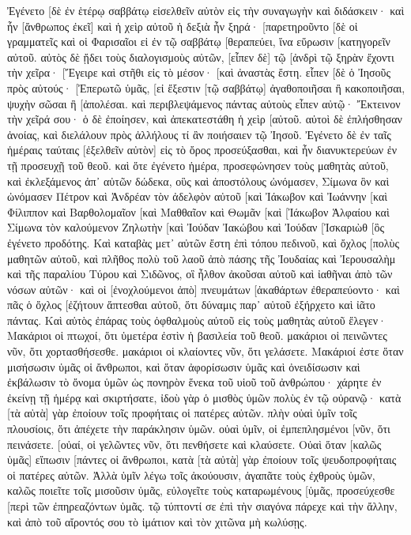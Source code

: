 Ἐγένετο [δὲ ἐν ἑτέρῳ σαββάτῳ εἰσελθεῖν αὐτὸν εἰς τὴν συναγωγὴν καὶ διδάσκειν· καὶ ἦν [ἄνθρωπος ἐκεῖ] καὶ ἡ χεὶρ αὐτοῦ ἡ δεξιὰ ἦν ξηρά· 
[παρετηροῦντο [δὲ οἱ γραμματεῖς καὶ οἱ Φαρισαῖοι εἰ ἐν τῷ σαββάτῳ [θεραπεύει, ἵνα εὕρωσιν [κατηγορεῖν αὐτοῦ. 
αὐτὸς δὲ ᾔδει τοὺς διαλογισμοὺς αὐτῶν, [εἶπεν δὲ] τῷ [ἀνδρὶ τῷ ξηρὰν ἔχοντι τὴν χεῖρα· [Ἔγειρε καὶ στῆθι εἰς τὸ μέσον· [καὶ ἀναστὰς ἔστη. 
εἶπεν [δὲ ὁ Ἰησοῦς πρὸς αὐτούς· [Ἐπερωτῶ ὑμᾶς, [εἰ ἔξεστιν [τῷ σαββάτῳ] ἀγαθοποιῆσαι ἢ κακοποιῆσαι, ψυχὴν σῶσαι ἢ [ἀπολέσαι. 
καὶ περιβλεψάμενος πάντας αὐτοὺς εἶπεν αὐτῷ· Ἔκτεινον τὴν χεῖρά σου· ὁ δὲ ἐποίησεν, καὶ ἀπεκατεστάθη ἡ χεὶρ [αὐτοῦ. 
αὐτοὶ δὲ ἐπλήσθησαν ἀνοίας, καὶ διελάλουν πρὸς ἀλλήλους τί ἂν ποιήσαιεν τῷ Ἰησοῦ. 
Ἐγένετο δὲ ἐν ταῖς ἡμέραις ταύταις [ἐξελθεῖν αὐτὸν] εἰς τὸ ὄρος προσεύξασθαι, καὶ ἦν διανυκτερεύων ἐν τῇ προσευχῇ τοῦ θεοῦ. 
καὶ ὅτε ἐγένετο ἡμέρα, προσεφώνησεν τοὺς μαθητὰς αὐτοῦ, καὶ ἐκλεξάμενος ἀπ᾽ αὐτῶν δώδεκα, οὓς καὶ ἀποστόλους ὠνόμασεν, 
Σίμωνα ὃν καὶ ὠνόμασεν Πέτρον καὶ Ἀνδρέαν τὸν ἀδελφὸν αὐτοῦ [καὶ Ἰάκωβον καὶ Ἰωάννην [καὶ Φίλιππον καὶ Βαρθολομαῖον 
[καὶ Μαθθαῖον καὶ Θωμᾶν [καὶ [Ἰάκωβον Ἁλφαίου καὶ Σίμωνα τὸν καλούμενον Ζηλωτὴν 
[καὶ Ἰούδαν Ἰακώβου καὶ Ἰούδαν [Ἰσκαριὼθ [ὃς ἐγένετο προδότης. 
Καὶ καταβὰς μετ᾽ αὐτῶν ἔστη ἐπὶ τόπου πεδινοῦ, καὶ ὄχλος [πολὺς μαθητῶν αὐτοῦ, καὶ πλῆθος πολὺ τοῦ λαοῦ ἀπὸ πάσης τῆς Ἰουδαίας καὶ Ἰερουσαλὴμ καὶ τῆς παραλίου Τύρου καὶ Σιδῶνος, 
οἳ ἦλθον ἀκοῦσαι αὐτοῦ καὶ ἰαθῆναι ἀπὸ τῶν νόσων αὐτῶν· καὶ οἱ [ἐνοχλούμενοι ἀπὸ] πνευμάτων [ἀκαθάρτων ἐθεραπεύοντο· 
καὶ πᾶς ὁ ὄχλος [ἐζήτουν ἅπτεσθαι αὐτοῦ, ὅτι δύναμις παρ᾽ αὐτοῦ ἐξήρχετο καὶ ἰᾶτο πάντας. 
Καὶ αὐτὸς ἐπάρας τοὺς ὀφθαλμοὺς αὐτοῦ εἰς τοὺς μαθητὰς αὐτοῦ ἔλεγεν· Μακάριοι οἱ πτωχοί, ὅτι ὑμετέρα ἐστὶν ἡ βασιλεία τοῦ θεοῦ. 
μακάριοι οἱ πεινῶντες νῦν, ὅτι χορτασθήσεσθε. μακάριοι οἱ κλαίοντες νῦν, ὅτι γελάσετε. 
Μακάριοί ἐστε ὅταν μισήσωσιν ὑμᾶς οἱ ἄνθρωποι, καὶ ὅταν ἀφορίσωσιν ὑμᾶς καὶ ὀνειδίσωσιν καὶ ἐκβάλωσιν τὸ ὄνομα ὑμῶν ὡς πονηρὸν ἕνεκα τοῦ υἱοῦ τοῦ ἀνθρώπου· 
χάρητε ἐν ἐκείνῃ τῇ ἡμέρᾳ καὶ σκιρτήσατε, ἰδοὺ γὰρ ὁ μισθὸς ὑμῶν πολὺς ἐν τῷ οὐρανῷ· κατὰ [τὰ αὐτὰ] γὰρ ἐποίουν τοῖς προφήταις οἱ πατέρες αὐτῶν. 
πλὴν οὐαὶ ὑμῖν τοῖς πλουσίοις, ὅτι ἀπέχετε τὴν παράκλησιν ὑμῶν. 
οὐαὶ ὑμῖν, οἱ ἐμπεπλησμένοι [νῦν, ὅτι πεινάσετε. [οὐαί, οἱ γελῶντες νῦν, ὅτι πενθήσετε καὶ κλαύσετε. 
Οὐαὶ ὅταν [καλῶς ὑμᾶς] εἴπωσιν [πάντες οἱ ἄνθρωποι, κατὰ [τὰ αὐτὰ] γὰρ ἐποίουν τοῖς ψευδοπροφήταις οἱ πατέρες αὐτῶν. 
Ἀλλὰ ὑμῖν λέγω τοῖς ἀκούουσιν, ἀγαπᾶτε τοὺς ἐχθροὺς ὑμῶν, καλῶς ποιεῖτε τοῖς μισοῦσιν ὑμᾶς, 
εὐλογεῖτε τοὺς καταρωμένους [ὑμᾶς, προσεύχεσθε [περὶ τῶν ἐπηρεαζόντων ὑμᾶς. 
τῷ τύπτοντί σε ἐπὶ τὴν σιαγόνα πάρεχε καὶ τὴν ἄλλην, καὶ ἀπὸ τοῦ αἴροντός σου τὸ ἱμάτιον καὶ τὸν χιτῶνα μὴ κωλύσῃς. 
